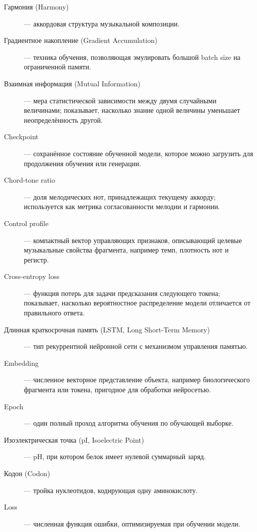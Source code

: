 \begin{description}
\item[Гармония (Harmony)] — аккордовая структура музыкальной композиции.

\item[Градиентное накопление (Gradient Accumulation)] — техника обучения, позволяющая эмулировать большой batch size на ограниченной памяти.

\item[Взаимная информация (Mutual Information)] — мера статистической зависимости между двумя случайными величинами; показывает, насколько знание одной величины уменьшает неопределённость другой.

\item[Checkpoint] — сохранённое состояние обученной модели, которое можно загрузить для продолжения обучения или генерации.

\item[Chord-tone ratio] — доля мелодических нот, принадлежащих текущему аккорду; используется как метрика согласованности мелодии и гармонии.

\item[Control profile] — компактный вектор управляющих признаков, описывающий целевые музыкальные свойства фрагмента, например темп, плотность нот и регистр.

\item[Cross-entropy loss] — функция потерь для задачи предсказания следующего токена; показывает, насколько вероятностное распределение модели отличается от правильного ответа.

\item[Длинная краткосрочная память (LSTM, Long Short-Term Memory)] — тип рекуррентной нейронной сети с механизмом управления памятью.

\item[Embedding] — численное векторное представление объекта, например биологического фрагмента или токена, пригодное для обработки нейросетью.

\item[Epoch] — один полный проход алгоритма обучения по обучающей выборке.

\item[Изоэлектрическая точка (pI, Isoelectric Point)] — pH, при котором белок имеет нулевой суммарный заряд.

\item[Кодон (Codon)] — тройка нуклеотидов, кодирующая одну аминокислоту.

\item[Loss] — численная функция ошибки, оптимизируемая при обучении модели.


\end{description}
